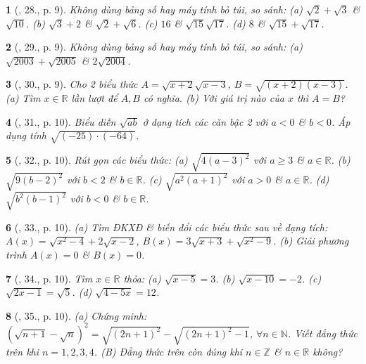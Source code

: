 \documentclass{article}
\newtheorem{baitoan}{}%
\begin{document}
\begin{baitoan}[\cite{SBT_Toan_9_tap_1}, 28., p. 9]
	Không dùng bảng số hay máy tính bỏ túi, so sánh: (a) $\sqrt{2} + \sqrt{3}$ \& $\sqrt{10}$. (b) $\sqrt{3} + 2$ \& $\sqrt{2} + \sqrt{6}$. (c) $16$ \& $\sqrt{15}\sqrt{17}$. (d) $8$ \& $\sqrt{15} + \sqrt{17}$.
\end{baitoan}

\begin{baitoan}[\cite{SBT_Toan_9_tap_1}, 29., p. 9]
	Không dùng bảng số hay máy tính bỏ túi, so sánh: (a) $\sqrt{2003} + \sqrt{2005}$ \& $2\sqrt{2004}$.
\end{baitoan}

\begin{baitoan}[\cite{SBT_Toan_9_tap_1}, 30., p. 9]
	Cho 2 biểu thức $A = \sqrt{x + 2}\sqrt{x - 3}$, $B = \sqrt{(x + 2)(x - 3)}$. (a) Tìm $x\in\mathbb{R}$ lần lượt để $A,B$  có nghĩa. (b) Với giá trị nào của $x$ thì $A = B$?
\end{baitoan}

\begin{baitoan}[\cite{SBT_Toan_9_tap_1}, 31., p. 10]
	Biểu diễn $\sqrt{ab}$ ở dạng tích các căn bậc 2 với $a < 0$ \& $b < 0$. Áp dụng tính $\sqrt{(-25)\cdot(-64)}$.
\end{baitoan}

\begin{baitoan}[\cite{SBT_Toan_9_tap_1}, 32., p. 10]
	Rút gọn các biểu thức: (a) $\sqrt{4(a - 3)^2}$ với $a\ge3$ \& $a\in\mathbb{R}$. (b) $\sqrt{9(b - 2)^2}$ với $b < 2$ \& $b\in\mathbb{R}$. (c) $\sqrt{a^2(a + 1)^2}$ với $a > 0$ \& $a\in\mathbb{R}$. (d) $\sqrt{b^2(b - 1)^2}$ với $b < 0$ \& $b\in\mathbb{R}$.
\end{baitoan}

\begin{baitoan}[\cite{SBT_Toan_9_tap_1}, 33., p. 10]
	(a) Tìm ĐKXĐ \& biến đổi các biểu thức sau về dạng tích: $A(x) = \sqrt{x^2 - 4} + 2\sqrt{x - 2}$, $B(x) = 3\sqrt{x + 3} + \sqrt{x^2 - 9}$. (b) Giải phương trình $A(x) = 0$ \& $B(x) = 0$.
\end{baitoan}

\begin{baitoan}[\cite{SBT_Toan_9_tap_1}, 34., p. 10]
	Tìm $x\in\mathbb{R}$ thỏa: (a) $\sqrt{x - 5} = 3$. (b) $\sqrt{x - 10} = -2$. (c) $\sqrt{2x - 1} = \sqrt{5}$. (d) $\sqrt{4 - 5x} = 12$.
\end{baitoan}

\begin{baitoan}[\cite{SBT_Toan_9_tap_1}, 35., p. 10]
	(a) Chứng minh: $\left(\sqrt{n + 1} - \sqrt{n}\right)^2 = \sqrt{(2n + 1)^2} - \sqrt{(2n + 1)^2 - 1}$, $\forall n\in\mathbb{N}$. Viết đẳng thức trên khi $n = 1,2,3,4$. (B) Đẳng thức trên còn đúng khi $n\in\mathbb{Z}$ \& $n\in\mathbb{R}$ không?
\end{baitoan}
\end{document}
